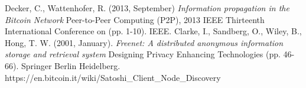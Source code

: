 \documentclass[a4paper, 10pt, conference]{ieeeconf}
\begin{document}
\begin{thebibliography}{9}
   Decker, C., Wattenhofer, R. (2013, September) 
    \emph{Information propagation in the Bitcoin Network} 
    Peer-to-Peer Computing (P2P), 2013 IEEE Thirteenth International Conference
    on (pp. 1-10). IEEE.
   Clarke, I., Sandberg, O., Wiley, B., Hong, T. W. 
    (2001, January). \emph{Freenet: A distributed anonymous information storage
    and retrieval system} Designing Privacy Enhancing Technologies (pp. 46-66).
    Springer Berlin Heidelberg.
    https://en.bitcoin.it/wiki/Satoshi\_Client\_Node\_Discovery
\end{thebibliography}
\end{document}

